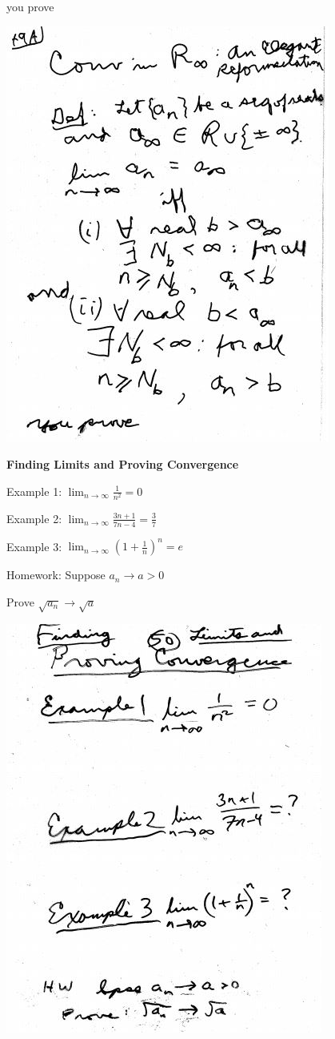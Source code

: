 \documentclass[10pt,a4paper]{article}
\begin{document}
you prove

\includegraphics[scale=.7]{Pages/S&L_page49(2)}

\newpage


{\bf Finding Limits and Proving Convergence}

Example 1: $\lim_{n \rightarrow \infty} \frac{1}{n^{2}} = 0$

Example 2: $\lim_{n \rightarrow \infty} \frac{3n+1}{7n-4} = \frac{3}{7}$

Example 3: $\lim_{n \rightarrow \infty} (1 + \frac{1}{n})^{n} = e$

Homework: Suppose $a_{n} \rightarrow a > 0$


Prove $\sqrt{a_{n}} \rightarrow \sqrt{a}$

\includegraphics[scale=.7]{Pages/S&L_page50}
\end{document}
